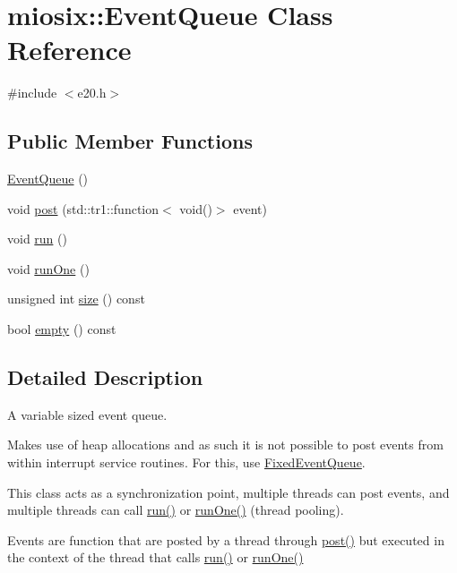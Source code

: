 \hypertarget{classmiosix_1_1_event_queue}{\section{miosix\-:\-:Event\-Queue Class Reference}
\label{classmiosix_1_1_event_queue}
}


{\ttfamily \#include $<$e20.\-h$>$}

\subsection*{Public Member Functions}
\begin{DoxyCompactItemize}
\item 
\hyperlink{classmiosix_1_1_event_queue_a6fd6570b6db1f48db1f4696f3f8fc176}{Event\-Queue} ()
\item 
void \hyperlink{classmiosix_1_1_event_queue_a9ada54bc6aebffc88fde5544c8c881c3}{post} (std\-::tr1\-::function$<$ void()$>$ event)
\item 
void \hyperlink{classmiosix_1_1_event_queue_a066baaa55a0367d7c9ddffbabc500aba}{run} ()
\item 
void \hyperlink{classmiosix_1_1_event_queue_a77a200274e60ca1c07164a7c30b96371}{run\-One} ()
\item 
unsigned int \hyperlink{classmiosix_1_1_event_queue_ad35cac0b7ba5e21378d898d1cda131e7}{size} () const 
\item 
bool \hyperlink{classmiosix_1_1_event_queue_a2afeb86904bae3becaab0e7bfaafab7a}{empty} () const 
\end{DoxyCompactItemize}


\subsection{Detailed Description}
A variable sized event queue.

Makes use of heap allocations and as such it is not possible to post events from within interrupt service routines. For this, use \hyperlink{classmiosix_1_1_fixed_event_queue}{Fixed\-Event\-Queue}.

This class acts as a synchronization point, multiple threads can post events, and multiple threads can call \hyperlink{classmiosix_1_1_event_queue_a066baaa55a0367d7c9ddffbabc500aba}{run()} or \hyperlink{classmiosix_1_1_event_queue_a77a200274e60ca1c07164a7c30b96371}{run\-One()} (thread pooling).

Events are function that are posted by a thread through \hyperlink{classmiosix_1_1_event_queue_a9ada54bc6aebffc88fde5544c8c881c3}{post()} but executed in the context of the thread that calls \hyperlink{classmiosix_1_1_event_queue_a066baaa55a0367d7c9ddffbabc500aba}{run()} or \hyperlink{classmiosix_1_1_event_queue_a77a200274e60ca1c07164a7c30b96371}{run\-One()} 

